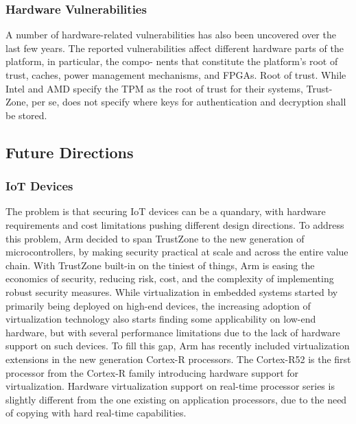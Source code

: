 \documentclass{article}
\begin{document}
\subsubsection{Hardware Vulnerabilities}

A number of hardware-related vulnerabilities has also been uncovered over the last few years. The
reported vulnerabilities affect different hardware parts of the platform, in particular, the compo-
nents that constitute the platform’s root of trust, caches, power management mechanisms, and
FPGAs.
Root of trust. While Intel and AMD specify the TPM as the root of trust for their systems, Trust-
Zone, per se, does not specify where keys for authentication and decryption shall be stored.

\subsection{Future Directions}

\subsubsection{IoT Devices}

The problem is that securing IoT devices can be a quandary, with hardware requirements and cost limitations pushing different design directions. To address this problem, Arm decided to span TrustZone to the new generation of microcontrollers, by making security practical at scale and across the entire value chain. With TrustZone built-in on the tiniest of things, Arm is easing the economics of security, reducing risk, cost, and the complexity of implementing robust security measures. While virtualization in embedded systems started by primarily being deployed on high-end devices, the increasing adoption of virtualization technology also starts finding some applicability on low-end hardware, but with several performance limitations due to the lack of hardware support on such devices. To fill this gap, Arm has recently included virtualization extensions in the new generation Cortex-R processors. The Cortex-R52 is the first processor from the Cortex-R family introducing hardware support for virtualization. Hardware virtualization support on real-time processor series is slightly different from the one existing on application processors, due to the need of copying with hard real-time capabilities.
\end{document}
